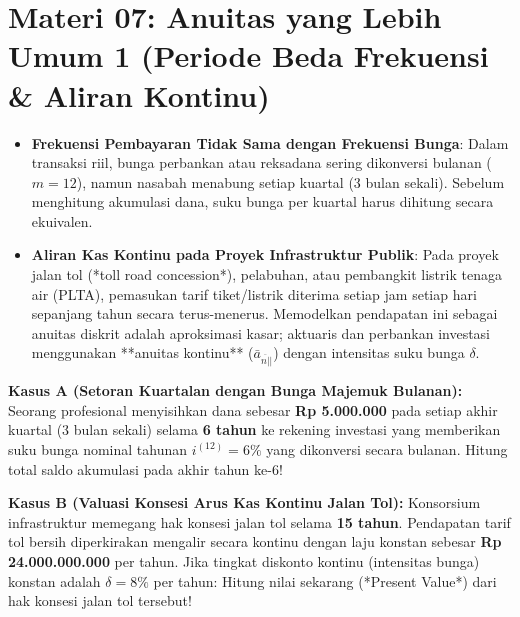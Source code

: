 \documentclass[11pt,a4paper]{article}
\newcommand{\angl}[1]{\overline{#1|}}
\begin{document}
\section*{Materi 07: Anuitas yang Lebih Umum 1 (Periode Beda Frekuensi \& Aliran Kontinu)}

\begin{kasusbox}
\begin{itemize}[leftmargin=4mm, topsep=1pt, itemsep=1pt]
    \item \textbf{Frekuensi Pembayaran Tidak Sama dengan Frekuensi Bunga}: Dalam transaksi riil, bunga perbankan atau reksadana sering dikonversi bulanan ($m=12$), namun nasabah menabung setiap kuartal (3 bulan sekali). Sebelum menghitung akumulasi dana, suku bunga per kuartal harus dihitung secara ekuivalen.
    \item \textbf{Aliran Kas Kontinu pada Proyek Infrastruktur Publik}: Pada proyek jalan tol (*toll road concession*), pelabuhan, atau pembangkit listrik tenaga air (PLTA), pemasukan tarif tiket/listrik diterima setiap jam setiap hari sepanjang tahun secara terus-menerus. Memodelkan pendapatan ini sebagai anuitas diskrit adalah aproksimasi kasar; aktuaris dan perbankan investasi menggunakan **anuitas kontinu** ($\bar{a}_{\angl{n}|}$) dengan intensitas suku bunga $\delta$.
\end{itemize}
\end{kasusbox}

\begin{soalbox}
\textbf{Kasus A (Setoran Kuartalan dengan Bunga Majemuk Bulanan):}  
Seorang profesional menyisihkan dana sebesar \textbf{Rp 5.000.000} pada setiap akhir kuartal (3 bulan sekali) selama \textbf{6 tahun} ke rekening investasi yang memberikan suku bunga nominal tahunan $i^{(12)} = 6\%$ yang dikonversi secara bulanan. Hitung total saldo akumulasi pada akhir tahun ke-6!

\textbf{Kasus B (Valuasi Konsesi Arus Kas Kontinu Jalan Tol):}  
Konsorsium infrastruktur memegang hak konsesi jalan tol selama \textbf{15 tahun}. Pendapatan tarif tol bersih diperkirakan mengalir secara kontinu dengan laju konstan sebesar \textbf{Rp 24.000.000.000} per tahun. Jika tingkat diskonto kontinu (intensitas bunga) konstan adalah $\delta = 8\%$ per tahun:  
Hitung nilai sekarang (*Present Value*) dari hak konsesi jalan tol tersebut!
\end{soalbox}
\end{document}
